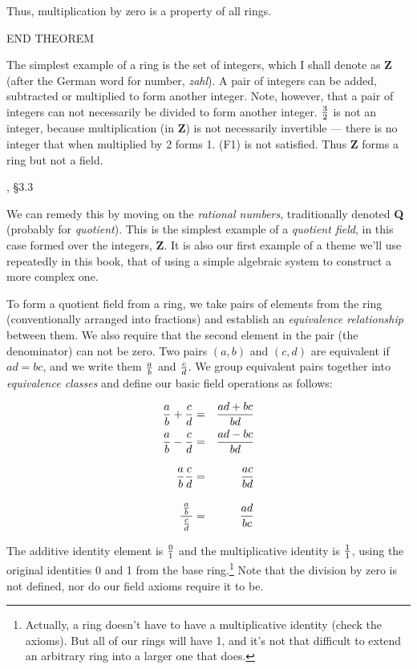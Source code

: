 Thus, multiplication by zero is a property of all rings.

END THEOREM

The simplest example of a ring is the set of integers, which I shall
denote as {\bf Z} (after the German word for number, {\it zahl}).  A pair
of integers can be added, subtracted or multiplied to form another
integer.  Note, however, that a pair of integers can not necessarily
be divided to form another integer.  $3 \over 2$ is not an integer,
because multiplication (in {\bf Z}) is not necessarily invertible ---
there is no integer that when multiplied by 2 forms 1.
(F1) is not satisfied.
Thus {\bf Z} forms a ring but not a field.

, \S3.3

We can remedy this by moving on the {\it rational numbers},
traditionally denoted {\bf Q} (probably for {\it quotient}).  This is the
simplest example of a {\it quotient field}, in this case formed over
the integers, {\bf Z}.  It is also our first example of a theme
we'll use repeatedly in this book, that of using a simple
algebraic system to construct a more complex one.

To form a quotient field from a ring, we take pairs of elements from
the ring (conventionally arranged into fractions) and establish an
{\it equivalence relationship} between them.  We also require that the
second element in the pair (the denominator) can not be zero.  Two
pairs $(a,b)$ and $(c,d)$ are equivalent if $ad=bc$, and we write them
$a\over b$ and $c\over d$.  We group equivalent pairs together into
{\it equivalence classes} and define our basic field operations as
follows:

\begin{center}
\begin{eqnarray*}
{a\over b} + {c\over d} &=& {{ad+bc}\over{bd}} \cr
{a\over b} - {c\over d} &=& {{ad-bc}\over{bd}} \cr
{a\over b} {c\over d} &=& {{ac}\over{bd}} \vbox to20pt{}\cr
{\,{a\over b}\, \over {c \over d}} &=& {{ad}\over{bc}} \vbox to24pt{}\cr
\end{eqnarray*}
\end{center}

The additive identity element is $0\over1$ and the multiplicative
identity is $1\over1$, using the original identities 0 and 1 from the
base ring.\footnote{Actually, a ring doesn't have to have a
multiplicative identity (check the axioms).  But all of
our rings will have 1, and it's not that difficult to extend
an arbitrary ring into a larger one that does.}
Note that the division by zero is not defined, nor do
our field axioms require it to be.

